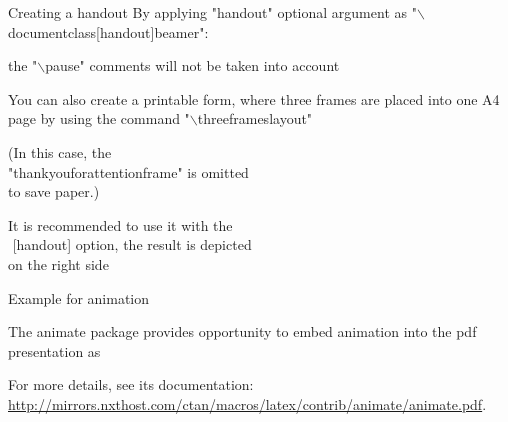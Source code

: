 \documentclass{beamer}
\begin{document}
	\begin{frame}{Creating a handout}
		By applying "handout" optional argument as
		"$\backslash$documentclass[handout]{beamer}":
		
		the "$\backslash$pause" comments will not be taken into account
		
		\vspace{5mm}
		
		You can also create a printable form, where three frames are placed into one A4 page by using the command "$\backslash$threeframeslayout"
		
		
		
		\begin{figure} %
				\vspace{-8.1mm}
				\vspace{9.1mm}
		\end{figure} 
	
		\vspace{2mm}
		(In this case, the\\ "thankyouforattentionframe" is omitted \\ to save paper.)
	
		\vspace{5mm}
		
		It is recommended to use it with  the \\ $ $ [handout] option, the result is depicted \\ on the right side
	\end{frame}
	
	\begin{frame}{Example for animation}
	
		The animate package provides opportunity to embed animation into the pdf presentation as
		
		For more details, see its documentation: \href{http://mirrors.nxthost.com/ctan/macros/latex/contrib/animate/animate.pdf}{\small http://mirrors.nxthost.com/ctan/macros/latex/contrib/animate/animate.pdf}.
	\end{frame}
\end{document}
